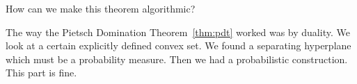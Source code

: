 



How can we make this theorem algorithmic?

The way the Pietsch Domination Theorem~\ref{thm:pdt} worked was by duality. 
We look at a certain explicitly defined convex set. We found a separating hyperplane which must be a probability measure. Then we had a probabilistic construction. This part is fine.



